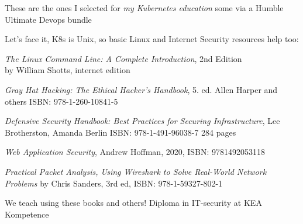 \documentclass[Screen16to9,17pt]{foils}
\begin{document}
These are the ones I selected for \emph{my Kubernetes education} some via a Humble Ultimate Devops bundle


Let's face it, K8s is Unix, so basic Linux and Internet Security resources help too:
\begin{list2}
\item \emph{The Linux Command Line: A Complete Introduction}, 2nd Edition\\
 by William Shotts, internet edition 
\item \emph{Gray Hat Hacking: The Ethical Hacker's Handbook}, 5. ed. Allen Harper and others ISBN: 978-1-260-10841-5
\item \emph{Defensive Security Handbook: Best Practices for Securing Infrastructure}, Lee Brotherston, Amanda Berlin ISBN: 978-1-491-96038-7 284 pages
\item \emph{Web Application Security}, Andrew Hoffman, 2020, ISBN: 9781492053118
\item \emph{Practical Packet Analysis, Using Wireshark to Solve Real-World Network Problems}
by Chris Sanders, 3rd ed, ISBN: 978-1-59327-802-1
\end{list2}

We teach using these books and others! Diploma in IT-security at KEA Kompetence\\
\end{document}
